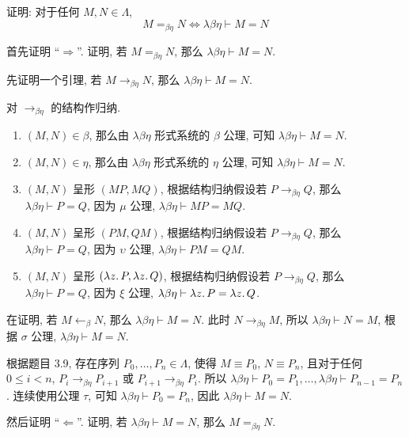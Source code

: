 \begin{problem}
证明: 对于任何 $M, N \in \Lambda$,
\[
M =_{\beta\eta} N \Leftrightarrow \lambda\beta\eta \vdash M = N
\]
\end{problem}

\begin{solution}
首先证明 ``$\Rightarrow$''. 证明, 若 $M =_{\beta\eta} N$, 那么 $\lambda\beta\eta \vdash M = N$.

先证明一个引理, 若 $M \to_{\beta\eta} N$, 那么 $\lambda\beta\eta \vdash M = N$.

对 $\to_{\beta\eta}$ 的结构作归纳.
\begin{enumerate}
\item $(M, N) \in \beta$, 那么由 $\lambda\beta\eta$ 形式系统的 $\beta$ 公理, 可知 $\lambda\beta\eta \vdash M = N$.
\item $(M, N) \in \eta$, 那么由 $\lambda\beta\eta$ 形式系统的 $\eta$ 公理, 可知 $\lambda\beta\eta \vdash M = N$.
\item $(M, N)$ 呈形 $(MP, MQ)$, 根据结构归纳假设若 $P \to_{\beta\eta} Q$, 那么 $\lambda\beta\eta \vdash P = Q$, 因为 $\mu$ 公理, $\lambda\beta\eta \vdash M P = M Q$.
\item $(M, N)$ 呈形 $(PM, QM)$, 根据结构归纳假设若 $P \to_{\beta\eta} Q$, 那么 $\lambda\beta\eta \vdash P = Q$, 因为 $\upsilon$ 公理, $\lambda\beta\eta \vdash PM = QM$.
\item $(M, N)$ 呈形 $(\lambda {z}.\,{P}, \lambda {z}.\,{Q})$, 根据结构归纳假设若 $P \to_{\beta\eta} Q$, 那么 $\lambda\beta\eta \vdash P = Q$, 因为 $\xi$ 公理, $\lambda\beta\eta \vdash \lambda {z}.\,{P} = \lambda {z}.\,{Q}$.
\end{enumerate}
在证明, 若 $M \leftarrow_\beta N$, 那么 $\lambda\beta\eta \vdash M = N$. 此时 $N \to_{\beta\eta} M$, 所以 $\lambda\beta\eta \vdash N = M$, 根据 $\sigma$ 公理, $\lambda\beta\eta \vdash M = N$.

根据题目 3.9, 存在序列 $P_0, \dots, P_n \in \Lambda$, 使得 $M \equiv P_0$, $N \equiv P_n$, 且对于任何 $0 \le i < n$, $P_i \to_{\beta\eta} P_{i+1}$ 或 $P_{i+1} \to_{\beta\eta} P_{i}$. 所以 $\lambda\beta\eta \vdash P_0 = P_1, \dots, \lambda\beta\eta \vdash P_{n-1} = P_n$. 连续使用公理 $\tau$, 可知 $\lambda\beta\eta \vdash P_0 = P_n$, 因此 $\lambda\beta\eta \vdash M = N$.

然后证明 ``$\Leftarrow$''. 证明, 若 $\lambda\beta\eta \vdash M = N$, 那么 $M =_{\beta\eta} N$.


\end{solution}
